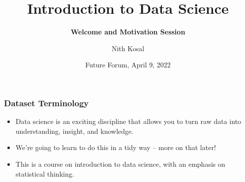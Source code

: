 \documentclass[11pt]{beamer}
\begin{document}
	\author[Nith Kosal]{Nith Kosal}
	\title[Presentation Title]{\textbf{Introduction to Data Science}}
	\subtitle{\textbf{Welcome and Motivation Session}}
	\date[\today]{Future Forum, April 9, 2022}
	\begin{frame}[plain]
		\maketitle
	\end{frame}
	



	
	\begin{frame}

		\frametitle{Dataset Terminology}
		
		\begin{itemize}
			\item Data science is an exciting discipline that allows you to turn raw data into understanding, insight, and knowledge.
			\item We're going to learn to do this in a tidy way -- more on that later!
			\item This is a course on introduction to data science, with an emphasis on statistical thinking.
		\end{itemize}
	\end{frame}
	
\end{document}
